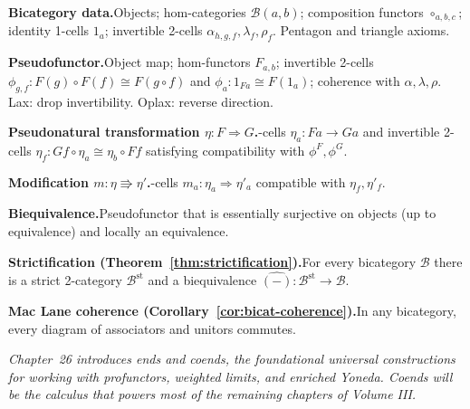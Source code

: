 \begin{formalrestatement}
\textbf{Bicategory data.}\quad Objects; hom-categories $\mathcal{B}(a,b)$;
composition functors $\circ_{a,b,c}$; identity 1-cells $1_a$; invertible
2-cells $\alpha_{h,g,f}, \lambda_f, \rho_f$. Pentagon and triangle axioms.

\medskip
\textbf{Pseudofunctor.}\quad Object map; hom-functors $F_{a,b}$;
invertible 2-cells $\phi_{g,f} : F(g) \circ F(f) \cong F(g \circ f)$ and
$\phi_a : 1_{Fa} \cong F(1_a)$; coherence with $\alpha, \lambda, \rho$.
Lax: drop invertibility. Oplax: reverse direction.

\medskip
\textbf{Pseudonatural transformation $\eta : F \Rightarrow G$.}-cells
$\eta_a : Fa \to Ga$ and invertible 2-cells $\eta_f : Gf \circ \eta_a \cong
\eta_b \circ Ff$ satisfying compatibility with $\phi^F, \phi^G$.

\medskip
\textbf{Modification $m : \eta \Rrightarrow \eta'$.}-cells $m_a :
\eta_a \Rightarrow \eta'_a$ compatible with $\eta_f, \eta'_f$.

\medskip
\textbf{Biequivalence.}\quad Pseudofunctor that is essentially surjective on
objects (up to equivalence) and locally an equivalence.

\medskip
\textbf{Strictification (Theorem~\ref{thm:strictification}).}\quad For every
bicategory $\mathcal{B}$ there is a strict 2-category $\mathcal{B}^{\mathrm{st}}$
and a biequivalence $\widehat{(-)} : \mathcal{B}^{\mathrm{st}} \to \mathcal{B}$.

\medskip
\textbf{Mac Lane coherence (Corollary~\ref{cor:bicat-coherence}).}\quad In any
bicategory, every diagram of associators and unitors commutes.

\medskip
\noindent\textit{Chapter~26 introduces \emph{ends and coends}, the foundational
universal constructions for working with profunctors, weighted limits, and
enriched Yoneda. Coends will be the calculus that powers most of the remaining
chapters of Volume III.}
\end{formalrestatement}
